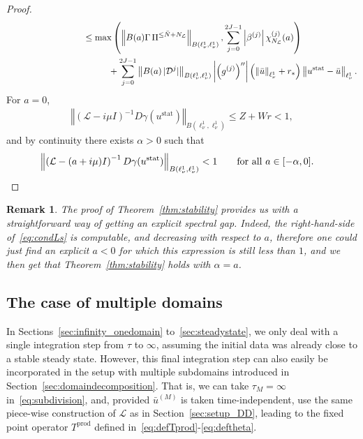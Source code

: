 \documentclass[10pt,a4paper]{article}
\theoremstyle{plain}
\newtheorem{remark}[theorem]{Remark}
\renewcommand{\L}{\mathcal{L}}
\newcommand{\D}{\mathcal{D}}
\newcommand{\bu}{\bar{u}}
\newcommand{\bN}{\bar{N}}
\newcommand{\1}{\mathbf{1}}
\newcommand{\rstar}{r_*}
\newcommand{\pprod}{\mathrm{prod}}
\newcommand{\stat}{\mathrm{stat}}
\newcommand{\NL}{N_{\text{\tiny{$\L$}}}}
\begin{document}
\begin{proof}
\begin{align}
& \hspace*{3cm} \leq \max\left( \left\Vert B(a)\Gamma \, \Pi^{\leq \bN+\NL} \right\Vert_{B(\ell^1_\nu,\ell^1_\nu)}, \sum_{j=0}^{2J-1} \left\vert \beta^{(j)}\right\vert \chi^{(j)}_{\NL}(a)\right)  \nonumber \\
& \hspace*{4cm} + \sum_{j=0}^{2J-1} \left\Vert B(a) \, \vert\D^j\vert\right\Vert_{B(\ell^1_\nu,\ell^1_\nu)}   \left \vert \left( g^{(j)} \right)'' \right \vert \left( \left\Vert \bar u \right\Vert_{\ell^1_\nu} + \rstar \right) \left\Vert u^\stat - \bu \right\Vert_{\ell^1_\nu}.  \label{eq:condLs}
\end{align}
For $a=0$,
\begin{align*}
\left\Vert \left(\L - i\mu I\right)^{-1} D\gamma(u^\stat) \right\Vert_{B(\ell^1_\nu,\ell^1_\nu)} \leq Z + Wr < 1,
\end{align*}
and by continuity there exists $\alpha>0$ such that 
\begin{align*}
\left\Vert \left(\L - (a+i\mu)I\right)^{-1} D\gamma(u^\stat) \right\Vert_{B(\ell^1_\nu,\ell^1_\nu)} & < 1 \qquad \text{for all }a\in[-\alpha,0]. \qedhere
\end{align*}
\end{proof}
%
\begin{remark}
The proof of Theorem~\ref{thm:stability} provides us with a straightforward way of getting an explicit spectral gap. Indeed, the right-hand-side of~\eqref{eq:condLs} is computable, and decreasing with respect to $a$, therefore one could just find an explicit $a<0$ for which this expression is still less than $1$, and we then get that Theorem~\ref{thm:stability} holds with $\alpha=a$.
\end{remark}



\subsection{The case of multiple domains}
\label{sec:infinity_DD}

In Sections~\ref{sec:infinity_onedomain} to~\ref{sec:steadystate}, we only deal with a single integration step from $\tau$ to $\infty$, assuming the initial data was already close to a stable steady state. However, this final integration step can also easily be incorporated in the setup with multiple subdomains introduced in Section~\ref{sec:domaindecomposition}. That is, we can take $\tau_M=\infty$  in~\eqref{eq:subdivision}, and, provided $\bu^{(M)}$ is taken time-independent, use the same piece-wise construction of $\L$ as in Section~\ref{sec:setup_DD}, leading to the fixed point operator $T^{\pprod}$ defined in~\eqref{eq:defTprod}-\eqref{eq:deftheta}.
\end{document}
